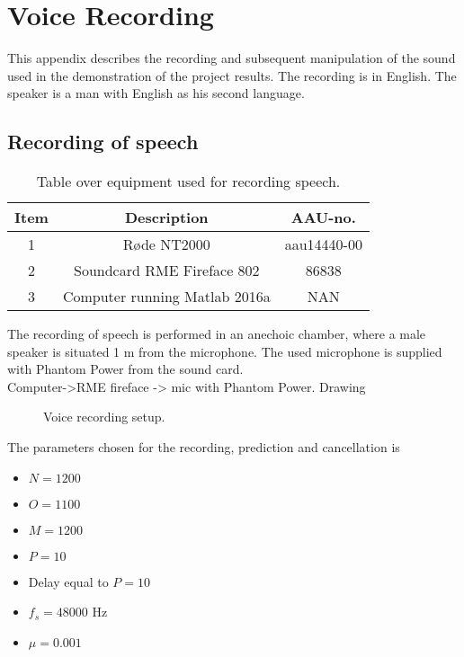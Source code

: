 \section{Voice Recording}
This appendix describes the recording and subsequent manipulation of the sound used in the demonstration of the project results. The recording is in English. The speaker is a man with English as his second language. 

\subsection{Recording of speech}
\begin{table}[H]
	\centering
	\begin{tabular}{ c c c } \toprule
		{Item}	& {Description} 						& {AAU-no}. \\ \bottomrule 
		1	& Røde NT2000 	& aau14440-00	\\
		2	& Soundcard RME Fireface 802	& 86838 		\\
		3	& Computer running Matlab 2016a	 & 	NAN	\\
		\bottomrule
	\end{tabular}
	\caption{Table over equipment used for recording speech.}
	\label{tab:VoiceRec}
\end{table}
The recording of speech is performed in an anechoic chamber, where a male speaker is situated 1 m from the microphone. The used microphone is supplied with Phantom Power from the sound card. \\ 

Computer->RME fireface -> mic with Phantom Power. Drawing

\begin{figure}[H]
	\centering
	\caption{Voice recording setup.}
	\label{fig:VoiceRecording}
\end{figure}

The parameters chosen for the recording, prediction and cancellation is
\begin{itemize}
	\item $N=1200$
	\item $O=1100$
	\item $M=1200$
	\item $P=10$
	\item Delay equal to $P=10$
	\item $f_s =48000$ Hz
	\item $\mu=0.001$
\end{itemize}



